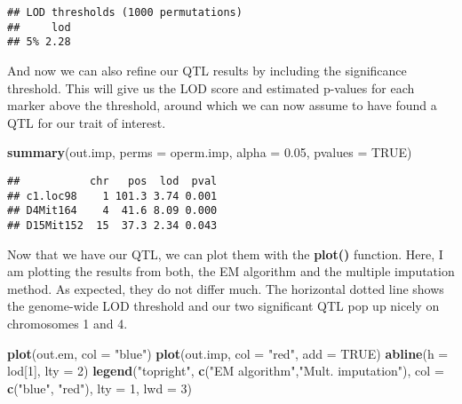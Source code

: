 \documentclass[12pt,]{krantz}
\makeatletter
\newenvironment{Shaded}{\begin{snugshade}}{\end{snugshade}}
\newcommand{\KeywordTok}[1]{\textcolor[rgb]{0.27,0.27,0.27}{\textbf{{#1}}}}
\newcommand{\DataTypeTok}[1]{\textcolor[rgb]{0.27,0.27,0.27}{{#1}}}
\newcommand{\DecValTok}[1]{\textcolor[rgb]{0.06,0.06,0.06}{{#1}}}
\newcommand{\FloatTok}[1]{\textcolor[rgb]{0.06,0.06,0.06}{{#1}}}
\newcommand{\StringTok}[1]{\textcolor[rgb]{0.5,0.5,0.5}{{#1}}}
\newcommand{\OtherTok}[1]{\textcolor[rgb]{0.37,0.37,0.37}{{#1}}}
\newcommand{\NormalTok}[1]{{#1}}
\newenvironment{kframe}{%
\medskip{}
\setlength{\fboxsep}{.8em}
 \def\at@end@of@kframe{}%
 \ifinner\ifhmode%
  \def\at@end@of@kframe{\end{minipage}}%
  \begin{minipage}{\columnwidth}%
 \fi\fi%
 \def\FrameCommand##1{\hskip\@totalleftmargin \hskip-\fboxsep
 \colorbox{shadecolor}{##1}\hskip-\fboxsep
     \hskip-\linewidth \hskip-\@totalleftmargin \hskip\columnwidth}%
 \MakeFramed {\advance\hsize-\width
   \@totalleftmargin\z@ \linewidth\hsize
   \@setminipage}}%
 {\par\unskip\endMakeFramed%
 \at@end@of@kframe}
\renewenvironment{Shaded}{\begin{kframe}}{\end{kframe}}
\makeatother
\begin{document}
\begin{verbatim}
## LOD thresholds (1000 permutations)
##     lod
## 5% 2.28
\end{verbatim}

And now we can also refine our QTL results by including the significance
threshold. This will give us the LOD score and estimated p-values for
each marker above the threshold, around which we can now assume to have
found a QTL for our trait of interest.

\begin{Shaded}
\begin{Highlighting}[]
\KeywordTok{summary}\NormalTok{(out.imp, }\DataTypeTok{perms =} \NormalTok{operm.imp, }\DataTypeTok{alpha =} \FloatTok{0.05}\NormalTok{, }\DataTypeTok{pvalues =} \OtherTok{TRUE}\NormalTok{)}
\end{Highlighting}
\end{Shaded}

\begin{verbatim}
##           chr   pos  lod  pval
## c1.loc98    1 101.3 3.74 0.001
## D4Mit164    4  41.6 8.09 0.000
## D15Mit152  15  37.3 2.34 0.043
\end{verbatim}

Now that we have our QTL, we can plot them with the \textbf{plot()}
function. Here, I am plotting the results from both, the EM algorithm
and the multiple imputation method. As expected, they do not differ
much. The horizontal dotted line shows the genome-wide LOD threshold and
our two significant QTL pop up nicely on chromosomes 1 and 4.

\begin{Shaded}
\begin{Highlighting}[]
\KeywordTok{plot}\NormalTok{(out.em, }\DataTypeTok{col =} \StringTok{"blue"}\NormalTok{)}
\KeywordTok{plot}\NormalTok{(out.imp, }\DataTypeTok{col =} \StringTok{"red"}\NormalTok{, }\DataTypeTok{add =} \OtherTok{TRUE}\NormalTok{)}
\KeywordTok{abline}\NormalTok{(}\DataTypeTok{h =} \NormalTok{lod[}\DecValTok{1}\NormalTok{], }\DataTypeTok{lty =} \DecValTok{2}\NormalTok{)}
\KeywordTok{legend}\NormalTok{(}\StringTok{"topright"}\NormalTok{, }\KeywordTok{c}\NormalTok{(}\StringTok{"EM algorithm"}\NormalTok{,}\StringTok{"Mult. imputation"}\NormalTok{), }\DataTypeTok{col =} \KeywordTok{c}\NormalTok{(}\StringTok{"blue"}\NormalTok{, }\StringTok{"red"}\NormalTok{), }\DataTypeTok{lty =} \DecValTok{1}\NormalTok{, }\DataTypeTok{lwd =} \DecValTok{3}\NormalTok{)}
\end{Highlighting}
\end{Shaded}
\end{document}
